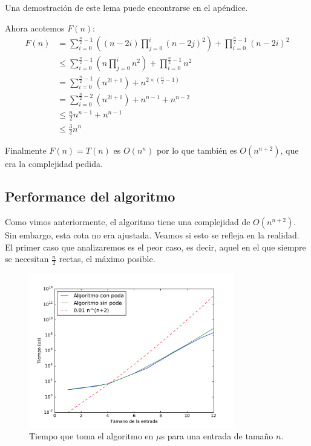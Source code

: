 Una demostración de este lema puede encontrarse en el apéndice.

  Ahora acotemos $F(n)$:
  \begin{equation}
  \begin{aligned}
  F(n) &= \sum_{i=0}^{\frac{n}{2}-1} \left((n-2i) \prod_{j=0}^{i}(n-2j)^2\right) + \prod_{i=0}^{\frac{n}{2}-1}(n-2i)^2 \\
  &\leq \sum_{i=0}^{\frac{n}{2}-1} \left(n \prod_{j=0}^{i}n^2\right) + \prod_{i=0}^{\frac{n}{2}-1}n^2 \\
  &= \sum_{i=0}^{\frac{n}{2}-1} (n^{2i+1}) + n^{2\times(\frac{n}{2}-1)} \\
  &= \sum_{i=0}^{\frac{n}{2}-2} (n^{2i+1}) + n^{n-1} + n^{n-2} \\
  &\leq \frac{n}{2} n^{n-1} + n^{n-1}\\
  &\leq \frac{3}{2} n^{n}
  \end{aligned}
  \end{equation}

  Finalmente $F(n) = T(n)$ es $O(n^n)$ por lo que también es $O(n^{n+2})$, que era la complejidad pedida. 

\subsection{Performance del algoritmo}

Como vimos anteriormente, el algoritmo tiene una complejidad de $O(n^{n+2})$. Sin embargo, esta cota no era ajustada. Veamos si esto se refleja en la realidad. El primer caso que analizaremos es el peor caso, es decir, aquel en el que siempre se necesitan $\frac{n}{2}$ rectas, el máximo posible.

\begin{figure}[H]
 \centering
	\includegraphics[width=0.8\textwidth]{img/tiempos/kamehameha1.pdf}
	\caption{\footnotesize Tiempo que toma el algoritmo en $\mu$s para una entrada de tamaño $n$.}
	\label{fig:kamehameha-tiempos1}
\end{figure}

